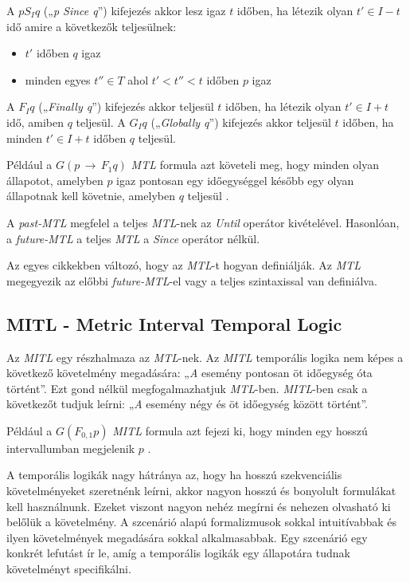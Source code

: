 A $p S_I q$ („\textit{p Since q}”) kifejezés akkor lesz igaz $t$ időben, ha létezik olyan $t' \in I - t$ idő amire a következők teljesülnek:
\begin{itemize}
    \item $t'$ időben $q$ igaz
    \item minden egyes $t'' \in T$ ahol $t' < t'' < t$ időben $p$ igaz
\end{itemize}

A $F_I q$ („\textit{Finally q}”) kifejezés akkor teljesül $t$ időben, ha létezik olyan $t' \in I + t$ idő, amiben $q$ teljesül.
A $G_I q$ („\textit{Globally q}”) kifejezés akkor teljesül $t$ időben, ha minden $t' \in I + t$ időben $q$ teljesül.

Például a $G(p \,\to\, F_{1} q)$ \textit{MTL} formula azt követeli meg, hogy minden olyan állapotot, amelyben $p$ igaz pontosan egy időegységgel később egy olyan állapotnak kell követnie, amelyben $q$ teljesül \cite{MTL1}.

A \textit{past-MTL} megfelel a teljes \textit{MTL}-nek az \textit{Until} operátor kivételével.
Hasonlóan, a \textit{future-MTL} a teljes \textit{MTL} a \textit{Since} operátor nélkül.

Az egyes cikkekben változó, hogy az \textit{MTL}-t hogyan definiálják.
Az \textit{MTL} megegyezik az előbbi \textit{future-MTL}-el vagy a teljes szintaxissal van definiálva.

\subsection{MITL - Metric Interval Temporal Logic}

Az \textit{MITL} \cite{MITL1} egy részhalmaza az \textit{MTL}-nek.
Az \textit{MITL} temporális logika nem képes a következő követelmény megadására: „\textit{A} esemény pontosan öt időegység óta történt”.
Ezt gond nélkül megfogalmazhatjuk \textit{MTL}-ben.
\textit{MITL}-ben csak a következőt tudjuk leírni: „\textit{A} esemény négy és öt időegység között történt”.

Például a $G(F_{0,1}p)$ \textit{MITL} formula azt fejezi ki, hogy minden egy hosszú intervallumban megjelenik $p$ \cite{MITL1}.

A temporális logikák nagy hátránya az, hogy ha hosszú szekvenciális követelményeket szeretnénk leírni, akkor nagyon hosszú és bonyolult formulákat kell használnunk.
Ezeket viszont nagyon nehéz megírni és nehezen olvasható ki belőlük a követelmény.
A szcenárió alapú formalizmusok sokkal intuitívabbak és ilyen követelmények megadására sokkal alkalmasabbak.
Egy szcenárió egy konkrét lefutást ír le, amíg a temporális logikák egy állapotára tudnak követelményt specifikálni.

